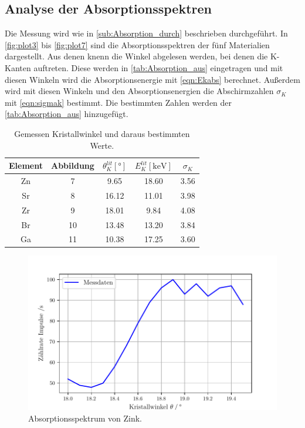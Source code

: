 \subsection{Analyse der Absorptionsspektren} %
\label{sub:Absorption_aus}
Die Messung wird wie in \autoref{sub:Absorption_durch} beschrieben durchgeführt.
In \autoref{fig:plot3} bis \ref{fig:plot7} sind die Absorptionsspektren der fünf Materialien dargestellt.
Aus denen knenn die Winkel abgelesen werden, bei denen die K-Kanten auftreten.
Diese werden in \autoref{tab:Absorption_aus} eingetragen und mit diesen Winkeln wird die Absorptionsenergie mit \autoref{eqn:Ekabs} berechnet.
Außerdem wird mit diesen Winkeln und den Absorptionsenergien die Abschirmzahlen $\sigma_K$ mit \autoref{eqn:sigmak} bestimmt.
Die bestimmten Zahlen werden der \autoref{tab:Absorption_aus} hinzugefügt.

\begin{table}[H]
  \centering
  \caption{Gemessen Kristallwinkel und daraus bestimmten Werte.}
  \label{tab:Vorbereitung}
  \begin{tabular}{c S[table-format=2.0] S S S[table-format=1.2] }
  \toprule
  {Element} & {Abbildung} & {$\theta_{K}^{lit} [\si{\degree}]$} & {$E_{K}^{lit} [\si{\kilo\electronvolt}]$}& {$\sigma_K$}\\
  \midrule
    Zn & 7 &  9.65 & 18.60 & 3.56 \\
    Sr & 8 & 16.12 & 11.01 & 3.98 \\
    Zr & 9 & 18.01 &  9.84 & 4.08 \\
    Br & 10 & 13.48 & 13.20 & 3.84 \\
    Ga & 11 & 10.38 & 17.25 & 3.60 \\ 
  \bottomrule
  \end{tabular}
\end{table}

\begin{figure}[H]
  \centering
  \includegraphics[width=\textwidth]{build/plot3.pdf}
  \caption{Absorptionsspektrum von Zink.}
  \label{fig:plot3}
\end{figure}


